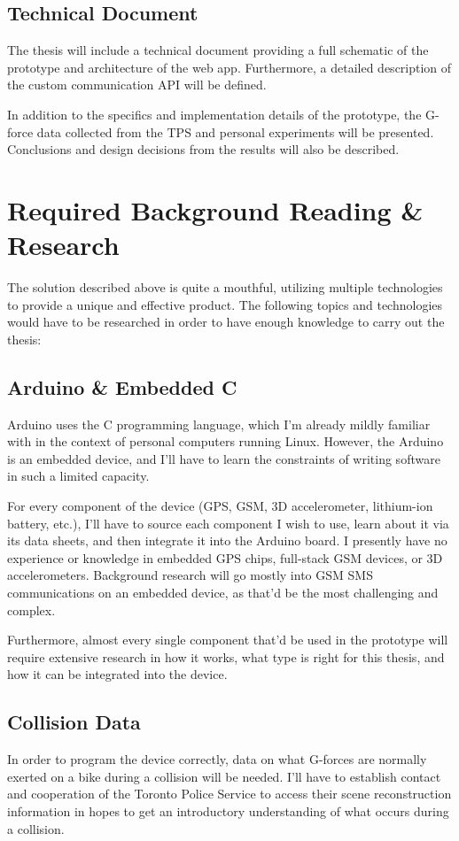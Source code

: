 \documentclass[titlepage]{article}
\begin{document}
{\subsection{Technical Document}
The thesis will include a technical document providing a full schematic of the prototype and architecture of the web app. Furthermore, a detailed description of the custom communication API will be defined.

In addition to the specifics and implementation details of the prototype, the G-force data collected from the TPS and personal experiments will be presented. Conclusions and design decisions from the results will also be described.

\section{Required Background Reading \& Research}
The solution described above is quite a mouthful, utilizing multiple technologies to provide a unique and effective product. The following topics and technologies would have to be researched in order to have enough knowledge to carry out the thesis:

\subsection{Arduino \& Embedded C}
Arduino uses the C programming language, which I'm already mildly familiar with in the context of personal computers running Linux. However, the Arduino is an embedded device, and I'll have to learn the constraints of writing software in such a limited capacity.

For every component of the device (GPS, GSM, 3D accelerometer, lithium-ion battery, etc.), I'll have to source each component I wish to use, learn about it via its data sheets, and then integrate it into the Arduino board. I presently have no experience or knowledge in embedded GPS chips, full-stack GSM devices, or 3D accelerometers. Background research will go mostly into GSM SMS communications on an embedded device, as that'd be the most challenging and complex.

Furthermore, almost every single component that'd be used in the prototype will require extensive research in how it works, what type is right for this thesis, and how it can be integrated into the device.

\subsection{Collision Data}
In order to program the device correctly, data on what G-forces are normally exerted on a bike during a collision will be needed. I'll have to establish contact and cooperation of the Toronto Police Service to access their scene reconstruction information in hopes to get an introductory understanding of what occurs during a collision.

}
\end{document}

